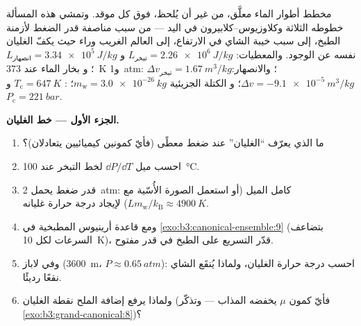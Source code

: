 \begin{problem}\label{pb:b3:phase-transitions:1}
مخطط أطوار الماء معلَّق، من غير أن يُلحظ، فوق كل موقد. وتمشي
هذه المسألة خطوطه الثلاثة وكلاوزيوس--كلابيرون في اليد ---
من سبب مناصفة قدر الضغط لأزمنة الطبخ، إلى سبب خيبة الشاي
في الارتفاع، إلى العالم الغريب وراء  حيث يكفّ الغليان نفسه عن الوجود. والمعطيات: $L_{\text{تبخر}}
= \qty{2.26e6}{J/kg}$ و $L_{\text{انصهار}} = \qty{3.34e5}{J/kg}$؛ و
بخار الماء عند \qty{373}{K} و\qty{1}{atm}: $\Delta v_{\text{تبخر}}
= \qty{1.67}{m^3/kg}$؛ والانصهار: $\Delta v = \qty{-9.1e-5}{m^3/kg}$؛ و
الكتلة الجزيئية $m_{\text{w}} = \qty{3.0e-26}{kg}$؛ :
$T_{\text{c}} = \qty{647}{K}$ و $P_{\text{c}} = \qty{221}{bar}$.

\medskip\noindent\textbf{الجزء الأول --- خط الغليان.}
\begin{enumerate}
  \item ما الذي يعرّف ``الغليان'' عند ضغط معطًى (فأيّ
        كمونين كيميائيين يتعادلان)؟
  \item احسب ميل $\dd P/\dd T$ لخط التبخر
        عند \qty{100}{\celsius}.
  \item قدر ضغط يحمل \qty{2}{atm}: كامل الميل
        (أو استعمل الصورة الأُسّية مع $Lm_{\text{w}}/
        k_{\text{B}} \approx \qty{4900}{K}$) لإيجاد درجة حرارة
        غليانه.
  \item ومع قاعدة أرينيوس المطبخية في
        \cref{exo:b3:canonical-ensemble:9} (بتضاعف السرعات لكل
        \qty{10}{K})، قدّر التسريع على الطبخ في قدر
        مفتوح.
  \item وفي لاباز (\qty{3600}{m}، $P \approx \qty{0.65}{atm}$):
        احسب درجة حرارة الغليان، ولماذا يُنقَع الشاي نقعًا رديئًا.
  \item ولماذا يرفع إضافة الملح نقطة الغليان (فأيّ كمون $\mu$
        يخفضه المذاب --- وتذكّر
        \cref{exo:b3:grand-canonical:8})؟
\end{enumerate}


\end{problem}
